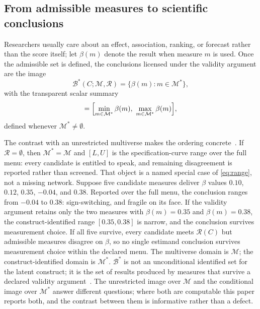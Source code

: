 \documentclass[10pt,letterpaper]{article}
\newcommand{\M}{\ensuremath{\mathcal{M}}}
\newcommand{\Rset}{\mathcal{R}}
\newcommand{\Bset}{\mathcal{B}}
\begin{document}
\subsection{From admissible measures to scientific conclusions}
\label{sec:propagate}

Researchers usually care about an effect, association, ranking, or forecast rather than the score itself; let $\beta(m)$ denote the result when measure $m$ is used.
Once the admissible set is defined, the conclusions licensed under the validity argument are the image
\begin{equation}
\Bset^*(C;\M,\Rset)=\bigl\{\beta(m):m\in\M^*\bigr\},
\label{eq:Theta}
\end{equation}
with the transparent scalar summary
\begin{equation}
[L,U]=\Bigl[\min_{m\in\M^*}\beta(m),\ \max_{m\in\M^*}\beta(m)\Bigr],
\label{eq:range}
\end{equation}
defined whenever $\M^*\neq\emptyset$.

The contrast with an unrestricted multiverse makes the ordering concrete~\cite{simonsohn2020}.
If $\Rset=\emptyset$, then $\M^*=\M$ and $[L,U]$ is the specification-curve range over the full menu: every candidate is entitled to speak, and remaining disagreement is reported rather than screened.
That object is a named special case of \eqref{eq:range}, not a missing network.
Suppose five candidate measures deliver $\beta$ values $0.10$, $0.12$, $0.35$, $-0.04$, and $0.38$.
Reported over the full menu, the conclusion ranges from $-0.04$ to $0.38$: sign-switching, and fragile on its face.
If the validity argument retains only the two measures with $\beta(m)=0.35$ and $\beta(m)=0.38$, the construct-identified range $[0.35,0.38]$ is narrow, and the conclusion survives measurement choice.
If all five survive, every candidate meets $\Rset(C)$ but admissible measures disagree on $\beta$, so no single estimand conclusion survives measurement choice within the declared menu.
The multiverse domain is $\M$; the construct-identified domain is $\M^*$.
$\Bset^*$ is not an unconditional identified set for the latent construct; it is the set of results produced by measures that survive a declared validity argument~\cite{manski2003,molinari2020}.
The unrestricted image over $\M$ and the conditional image over $\M^*$ answer different questions; where both are computable this paper reports both, and the contrast between them is informative rather than a defect.
\end{document}
